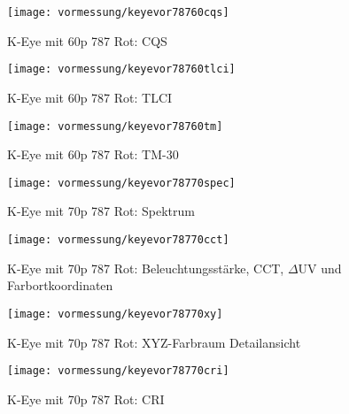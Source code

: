 \documentclass[pagesize,paper=A4,fontsize=12pt,utf8,numbers=noenddot,bibliography=totoc,listof=totoc,DIV=11,BCOR=1mm]{scrreprt}
\begin{document}
\begin{figure}[htp]     %
\centering
\texttt{[image: vormessung/keyevor78760cqs]} 
\caption {K-Eye mit 60p 787 Rot: CQS} 
\end{figure}

\begin{figure}[htp]     %
\centering
\texttt{[image: vormessung/keyevor78760tlci]} 
\caption {K-Eye mit 60p 787 Rot: TLCI} 
\end{figure}

\begin{figure}[htp]     %
\centering
\texttt{[image: vormessung/keyevor78760tm]} 
\caption {K-Eye mit 60p 787 Rot: TM-30} 
\end{figure}




\begin{figure}[htp]     %
\centering
\texttt{[image: vormessung/keyevor78770spec]} 
\caption {K-Eye mit 70p 787 Rot: Spektrum} 
\end{figure}

\begin{figure}[htp]     %
\centering
\texttt{[image: vormessung/keyevor78770cct]} 
\caption {K-Eye mit 70p 787 Rot: Beleuchtungsstärke, CCT, $\Delta$UV und Farbortkoordinaten} 
\end{figure}

\begin{figure}[htp]     %
\centering
\texttt{[image: vormessung/keyevor78770xy]} 
\caption {K-Eye mit 70p 787 Rot: XYZ-Farbraum Detailansicht} 
\end{figure}

\begin{figure}[htp]     %
\centering
\texttt{[image: vormessung/keyevor78770cri]} 
\caption {K-Eye mit 70p 787 Rot: CRI} 
\end{figure}
\end{document}
